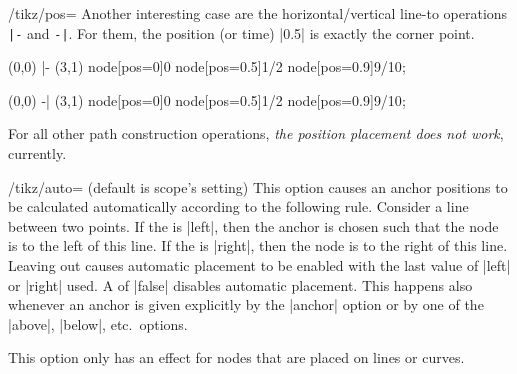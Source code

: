 \begin{key}{/tikz/pos=}
    Another interesting case are the horizontal/vertical line-to operations
    \verb!|-! and \verb!-|!. For them, the position (or time) |0.5| is exactly
    the corner point.
\begin{codeexample}[]
\tikz \draw (0,0) |- (3,1)
  node[pos=0]{0} node[pos=0.5]{1/2} node[pos=0.9]{9/10};
\end{codeexample}

\begin{codeexample}[]
\tikz \draw (0,0) -| (3,1)
  node[pos=0]{0} node[pos=0.5]{1/2} node[pos=0.9]{9/10};
\end{codeexample}

    For all other path construction operations, \emph{the position placement
    does not work}, currently.
\end{key}

\begin{key}{/tikz/auto= (default \normalfont is scope's setting)}
    This option causes an anchor positions to be calculated automatically
    according to the following rule. Consider a line between two points. If the
     is |left|, then the anchor is chosen such that the node is
    to the left of this line. If the  is |right|, then the node
    is to the right of this line. Leaving out  causes automatic
    placement to be enabled with the last value of |left| or |right| used. A
     of |false| disables automatic placement. This happens also
    whenever an anchor is given explicitly by the |anchor| option or by one of
    the |above|, |below|, etc.\ options.

    This option only has an effect for nodes that are placed on lines or
    curves.
\begin{codeexample}[]
\end{codeexample}
\end{key}

